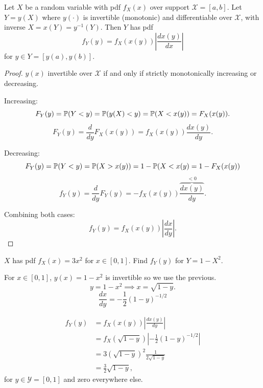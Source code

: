 \documentclass[10pt, a4paper]{article}
\begin{document}
\begin{proposition}
    Let $X$ be a random variable with pdf $f_{X}(x)$ over support $\mathcal{X} = [a, b]$.
    Let $Y = y(X)$ where $y(\cdot)$ is invertible
    (monotonic)
    and differentiable over $\mathcal{X}$,
    with inverse $X = x(Y) = y ^ {-1}(Y)$.
    Then $Y$ has pdf
    \[
    f_{Y}(y) = f_{X}(x(y))\left|\frac{dx(y)}{dx}\right|
    \]
    for $y \in Y = [y(a), y(b)]$.

    \begin{proof}
        $y(x)$ invertible over $\mathcal{X}$ if and only if strictly monotonically increasing or decreasing.

        Increasing:
        \[
        F_{Y}(y) = \P(Y < y) = \P(y(X) < y) = \P(X < x(y)) = F_{X}(x(y)).
        \]
        \[
        F_{Y}(y) = \frac{d}{dy}F_{X}(x(y)) = f_X(x(y))\frac{dx(y)}{dy}.
        \]

        Decreasing:
        \[
        F_{Y}(y) = \P(Y < y) = \P(X > x(y)) = 1 - \P(X < x(y) = 1 - F_{X}(x(y))
        \]
        \[
        f_{Y}(y) = \frac{d}{dy}F_{Y}(y) = -f_{X}(x(y))\overbrace{\frac{dx(y)}{dy}}^{<0}.
        \]

        Combining both cases:
        \[
        f_{Y}(y) = f_{X}(x(y))\left|\frac{dx}{dy}\right|.
        \]
    \end{proof}
\end{proposition}

\begin{example}
    $X$ has pdf $f_{X}(x) = 3x ^ 2$ for $x \in [0, 1]$.
    Find $f_{Y}(y)$ for $Y = 1 - X ^ 2$.

    \begin{solution}
        For $x \in [0, 1]$,
        $y(x) = 1 - x ^ 2$ is invertible so we use the previous.
        \[
        y = 1 - x ^ 2 \implies x = \sqrt{1 - y}.
        \]
        \[
        \frac{dx}{dy} = -\frac{1}{2}(1 - y) ^ {-1 / 2}
        \]

        \begin{align*}
            f_{Y}(y) &= f_{X}(x(y))\left|\frac{dx(y)}{dy}\right| \\
            &= f_{X}(\sqrt{1 - y})\left|-\frac{1}{2}(1 - y) ^ {-1 / 2}\right| \\
            &= 3(\sqrt{1 - y}) ^ 2\frac{1}{2\sqrt{1 - y}} \\
            &= \frac{3}{2}\sqrt{1 - y},
        \end{align*}
        for $y \in \mathcal{Y} = [0, 1]$ and zero everywhere else.
    \end{solution}
\end{example}
\end{document}
